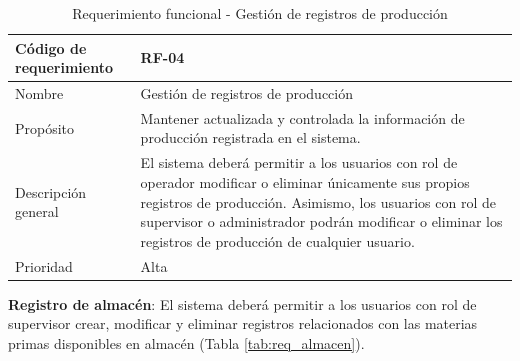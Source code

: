 \begin{table}[H]
    \centering
    \caption{Requerimiento funcional - Gestión de registros de producción}
    \label{tab:req_registros}
    \begin{tabularx}{\textwidth}{|X|X|}
        \hline
        Código de requerimiento & RF-04                                                                                                                                                                                                                                                                         \\ \hline
        Nombre                  & Gestión de registros de producción                                                                                                                                                                                                                                            \\ \hline
        Propósito               & Mantener actualizada y controlada la información de producción registrada en el sistema.                                                                                                                                                                                      \\ \hline
        Descripción general     & El sistema deberá permitir a los usuarios con rol de operador modificar o eliminar únicamente sus propios registros de producción. Asimismo, los usuarios con rol de supervisor o administrador podrán modificar o eliminar los registros de producción de cualquier usuario. \\ \hline
        Prioridad               & Alta                                                                                                                                                                                                                                                                          \\ \hline
    \end{tabularx}
\end{table}


\textbf{Registro de almacén}: El sistema deberá permitir a los usuarios con rol de supervisor crear, modificar y eliminar registros relacionados con las materias primas disponibles en almacén (Tabla \ref{tab:req_almacen}).

